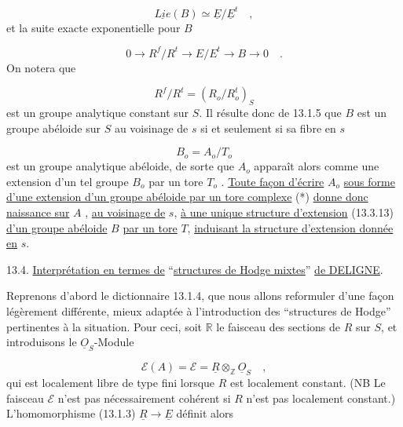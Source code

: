 \begin{equation}\tag{13.3.14}
\underline{Lie}(B) \simeq \underline{E}/\underline{E}^{t} \quad ,
\end{equation}
et la suite exacte exponentielle pour $B$



\begin{equation}\tag{13.3.15}
0 \longrightarrow R^f/R^t \longrightarrow E/E^t \longrightarrow B \longrightarrow 0 \quad .
\end{equation}
On notera que

\begin{equation}\tag{13.3.16}
R^f/R^t = (R_o/R_o^t)_S
\end{equation}
est un groupe analytique constant sur $S$. Il résulte donc de 13.1.5 que $B$ est un groupe abéloide sur $S$ au voisinage de $s$ si et seulement si sa fibre en $s$

\begin{equation*}
B_o = A_o/T_o
\end{equation*}
est un groupe analytique abéloide, de sorte que $A_o$ apparaît alors comme une extension d'un tel groupe $B_o$ par un tore $T_o$ . \underline{Toute façon d'écrire} $A_o$ \underline{sous forme d'une extension d'un groupe abéloide par un tore complexe} (*) \underline{donne donc naissance sur} $A$ , \underline{au voisinage de} $s$, \underline{à une unique structure d'extension} (13.3.13) \underline{d'un groupe abéloide} $B$ \underline{par un tore} $T$, \underline{induisant la structure d'extension donnée en} $s$.


13.4. \underline{Interprétation en termes de} ``\underline{structures de Hodge mixtes}'' \underline{de DELIGNE}.

Reprenons d'abord le dictionnaire 13.1.4, que nous allons reformuler d'une façon légèrement différente, mieux adaptée à l'introduction des ``structures de Hodge'' pertinentes à la situation. Pour ceci, soit $\mathbb{R}$ le faisceau des sections de $R$ sur $S$, et introduisons le $\underline{O}_S$-Module

\begin{equation}\tag{13.4.1}
\mathcal{E}(A) = \mathcal{E} = \underline{R} \otimes_{\mathbb{Z}} \underline{O}_S \quad ,
\end{equation}
qui est localement libre de type fini lorsque $R$ est localement constant. (NB Le faisceau $\mathcal{E}$ n'est pas nécessairement cohérent si $R$ n'est pas localement constant.) L'homomorphisme (13.1.3) $\underline{R} \longrightarrow \underline{E}$ définit alors


